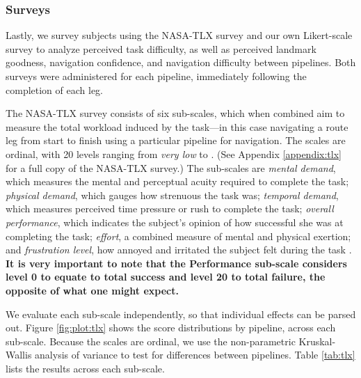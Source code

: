 \subsubsection{Surveys}
Lastly, we survey subjects using the NASA-TLX survey \cite{hart1988development} and our own Likert-scale survey to analyze perceived task difficulty, as well as perceived landmark goodness, navigation confidence, and navigation difficulty between pipelines. Both surveys were administered for each pipeline, immediately following the completion of each leg.

The NASA-TLX survey consists of six sub-scales, which when combined aim to measure the total workload induced by the task---in this case navigating a route leg from start to finish using a particular pipeline for navigation. The scales are ordinal, with 20 levels ranging from \textit{very low} to . (See Appendix \ref{appendix:tlx} for a full copy of the NASA-TLX survey.) The sub-scales are \textit{mental demand}, which measures the mental and perceptual acuity required to complete the task; \textit{physical demand}, which gauges how strenuous the task was; \textit{temporal demand}, which measures perceived time pressure or rush to complete the task; \textit{overall performance}, which indicates the subject's opinion of how successful she was at completing the task; \textit{effort}, a combined measure of mental and physical exertion; and \textit{frustration level}, how annoyed and irritated the subject felt during the task \cite{hart1988development}. \textbf{It is very important to note that the Performance sub-scale considers level 0 to equate to total success and level 20 to total failure, the opposite of what one might expect.}

We evaluate each sub-scale independently, so that individual effects can be parsed out. Figure \ref{fig:plot:tlx} shows the score distributions by pipeline, across each sub-scale. Because the scales are ordinal, we use the non-parametric Kruskal-Wallis analysis of variance to test for differences between pipelines. Table \ref{tab:tlx} lists the results across each sub-scale.

